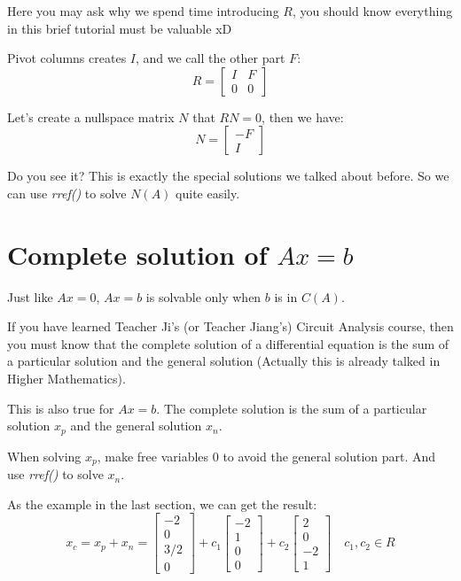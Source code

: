 \documentclass[10pt,a4paper,oneside,numbers=noenddot]{scrbook}
\theoremstyle{ctplain}
\theoremstyle{ctresult}
\begin{document}
Here you may ask why we spend time introducing $R$, you should know everything in this
brief tutorial must be valuable xD

Pivot columns creates $I$, and we call the other part $F$:
\[
  R = \begin{bmatrix}
    I & F \\
    0 & 0
  \end{bmatrix}
\]

Let's create a nullspace matrix $N$ that $RN = 0$, then we have:
\[
  N = \begin{bmatrix}
    -F \\ I
  \end{bmatrix}
\]

Do you see it? This is exactly the special solutions we talked about before.
So we can use \textit{rref()} to solve $N(A)$ quite easily.

\section{Complete solution of $Ax = b$}

Just like $Ax = 0$, $Ax = b$ is solvable only when $b$ is in $C(A)$.

If you have learned Teacher Ji's (or Teacher Jiang's) Circuit Analysis course, then
you must know that the complete solution of a differential equation is the sum of a
particular solution and the general solution (Actually this is already talked in
Higher Mathematics).

This is also true for $Ax = b$. The complete solution is the sum of a particular
solution $x_p$ and the general solution $x_n$.

When solving $x_p$, make free variables 0 to avoid the general solution part. And
use \textit{rref()} to solve $x_n$.

As the example in the last section, we can get the result:
\[
  x_c = x_p + x_n =
  \begin{bmatrix}
    -2 \\ 0 \\ 3/2 \\ 0
  \end{bmatrix} +
  c_1 \begin{bmatrix} -2 \\ 1 \\ 0 \\ 0 \end{bmatrix} +
  c_2 \begin{bmatrix} 2 \\ 0 \\ -2 \\ 1 \end{bmatrix}
  \quad c_1, c_2 \in R
\]
\end{document}
